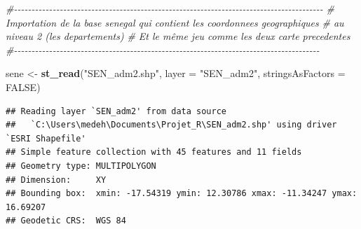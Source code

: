 \documentclass[
]{article}
\newenvironment{Shaded}{\begin{snugshade}}{\end{snugshade}}
\newcommand{\AttributeTok}[1]{\textcolor[rgb]{0.13,0.29,0.53}{#1}}
\newcommand{\CommentTok}[1]{\textcolor[rgb]{0.56,0.35,0.01}{\textit{#1}}}
\newcommand{\ConstantTok}[1]{\textcolor[rgb]{0.56,0.35,0.01}{#1}}
\newcommand{\FunctionTok}[1]{\textcolor[rgb]{0.13,0.29,0.53}{\textbf{#1}}}
\newcommand{\NormalTok}[1]{#1}
\newcommand{\OtherTok}[1]{\textcolor[rgb]{0.56,0.35,0.01}{#1}}
\newcommand{\StringTok}[1]{\textcolor[rgb]{0.31,0.60,0.02}{#1}}
\begin{document}
\begin{Shaded}
\begin{Highlighting}[]
\CommentTok{\#{-}{-}{-}{-}{-}{-}{-}{-}{-}{-}{-}{-}{-}{-}{-}{-}{-}{-}{-}{-}{-}{-}{-}{-}{-}{-}{-}{-}{-}{-}{-}{-}{-}{-}{-}{-}{-}{-}{-}{-}{-}{-}{-}{-}{-}{-}{-}{-}{-}{-}{-}{-}{-}{-}{-}{-}{-}{-}{-}{-}{-}{-}{-}{-}{-}{-}{-}{-}{-}{-}{-}{-}{-}{-}{-}{-}{-}{-}{-}{-}{-}{-}{-}{-}{-}{-}{-}{-}}
\CommentTok{\# Importation de la base senegal qui contient les coordonnees geographiques }
\CommentTok{\#    au niveau 2 (les departements) }
\CommentTok{\#   Et le même jeu comme les deux carte precedentes}
\CommentTok{\#{-}{-}{-}{-}{-}{-}{-}{-}{-}{-}{-}{-}{-}{-}{-}{-}{-}{-}{-}{-}{-}{-}{-}{-}{-}{-}{-}{-}{-}{-}{-}{-}{-}{-}{-}{-}{-}{-}{-}{-}{-}{-}{-}{-}{-}{-}{-}{-}{-}{-}{-}{-}{-}{-}{-}{-}{-}{-}{-}{-}{-}{-}{-}{-}{-}{-}{-}{-}{-}{-}{-}{-}{-}{-}{-}{-}{-}{-}{-}{-}{-}{-}{-}{-}{-}{-}{-}}

\NormalTok{sene }\OtherTok{\textless{}{-}} \FunctionTok{st\_read}\NormalTok{(}\StringTok{"SEN\_adm2.shp"}\NormalTok{, }\AttributeTok{layer =} \StringTok{"SEN\_adm2"}\NormalTok{, }\AttributeTok{stringsAsFactors =} \ConstantTok{FALSE}\NormalTok{)}
\end{Highlighting}
\end{Shaded}

\begin{verbatim}
## Reading layer `SEN_adm2' from data source 
##   `C:\Users\medeh\Documents\Projet_R\SEN_adm2.shp' using driver `ESRI Shapefile'
## Simple feature collection with 45 features and 11 fields
## Geometry type: MULTIPOLYGON
## Dimension:     XY
## Bounding box:  xmin: -17.54319 ymin: 12.30786 xmax: -11.34247 ymax: 16.69207
## Geodetic CRS:  WGS 84
\end{verbatim}
\end{document}
